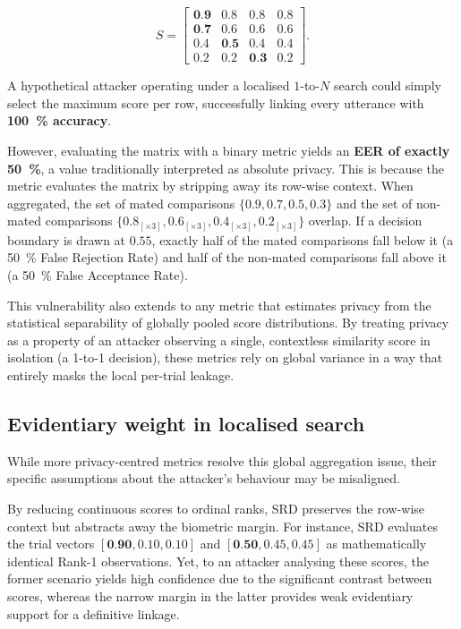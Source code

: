 \begin{equation}
\label{eq:score_matrix}
S = 
\begin{bmatrix}
\textbf{0.9} & 0.8 & 0.8 & 0.8 \\
\textbf{0.7} & 0.6 & 0.6 & 0.6 \\
0.4 & \textbf{0.5} & 0.4  & 0.4 \\
0.2 & 0.2 & \textbf{0.3} & 0.2 
\end{bmatrix}.
\end{equation}

A hypothetical attacker operating under a localised $1$-to-$N$ search could simply select the maximum score per row, successfully linking every utterance with \textbf{{\qty{100}{\percent}} accuracy}. 

However, evaluating the matrix with a binary metric yields an \textbf{EER of exactly \qty{50}{\percent}}, a value traditionally interpreted as absolute privacy. This is because the metric evaluates the matrix by stripping away its row-wise context. When aggregated, the set of mated comparisons $\{0.9, 0.7, 0.5, 0.3\}$ and the set of non-mated comparisons $\{ 0.8_{[\times 3]}, 0.6_{[\times 3]}, 0.4_{[\times 3]}, 0.2_{[\times 3]} \}$ overlap. If a decision boundary is drawn at $0.55$, exactly half of the mated comparisons fall below it (a \qty{50}{\percent} False Rejection Rate) and half of the non-mated comparisons fall above it (a \qty{50}{\percent} False Acceptance Rate). 

This vulnerability also extends to any metric that estimates privacy from the statistical separability of globally pooled score distributions. By treating privacy as a property of an attacker observing a single, contextless similarity score in isolation (a 1-to-1 decision), these metrics rely on global variance in a way that entirely masks the local per-trial leakage.
 

\subsection{Evidentiary weight in localised search}

While more privacy-centred metrics resolve this global aggregation issue, their specific assumptions about the attacker's behaviour may be misaligned. 

By reducing continuous scores to ordinal ranks, SRD preserves the row-wise context but abstracts away the biometric margin. For instance, SRD evaluates the trial vectors $[\textbf{0.90}, 0.10, 0.10]$ and $[\textbf{0.50}, 0.45, 0.45]$ as mathematically identical Rank-1 observations. Yet, to an attacker analysing these scores, the former scenario yields high confidence due to the significant contrast between scores, whereas the narrow margin in the latter provides weak evidentiary support for a definitive linkage.

